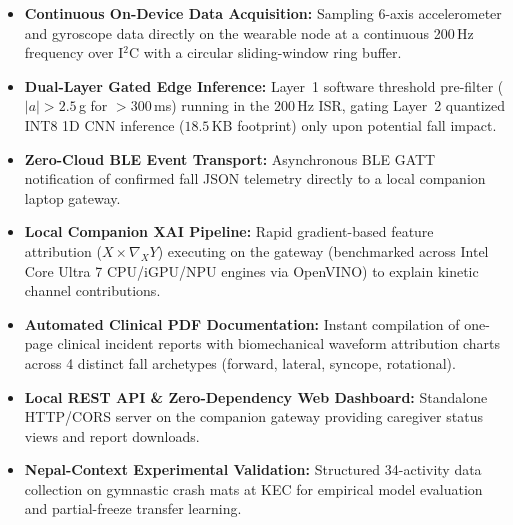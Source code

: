 \begin{itemize}
    \item \textbf{Continuous On-Device Data Acquisition:} Sampling 6-axis accelerometer and gyroscope data directly on the wearable node at a continuous 200\,Hz frequency over I$^2$C with a circular sliding-window ring buffer.
    \item \textbf{Dual-Layer Gated Edge Inference:} Layer~1 software threshold pre-filter ($|a| > 2.5$\,g for $>300$\,ms) running in the 200\,Hz ISR, gating Layer~2 quantized INT8 1D CNN inference ($18.5$\,KB footprint) only upon potential fall impact.
    \item \textbf{Zero-Cloud BLE Event Transport:} Asynchronous BLE GATT notification of confirmed fall JSON telemetry directly to a local companion laptop gateway.
    \item \textbf{Local Companion XAI Pipeline:} Rapid gradient-based feature attribution ($X \times \nabla_X Y$) executing on the gateway (benchmarked across Intel Core Ultra 7 CPU/iGPU/NPU engines via OpenVINO) to explain kinetic channel contributions.
    \item \textbf{Automated Clinical PDF Documentation:} Instant compilation of one-page clinical incident reports with biomechanical waveform attribution charts across 4 distinct fall archetypes (forward, lateral, syncope, rotational).
    \item \textbf{Local REST API \& Zero-Dependency Web Dashboard:} Standalone HTTP/CORS server on the companion gateway providing caregiver status views and report downloads.
    \item \textbf{Nepal-Context Experimental Validation:} Structured 34-activity data collection on gymnastic crash mats at KEC for empirical model evaluation and partial-freeze transfer learning.
\end{itemize}
